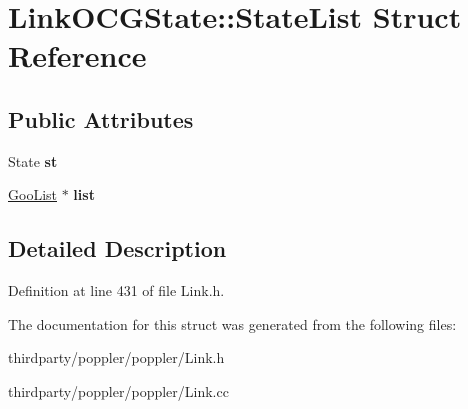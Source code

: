 \hypertarget{struct_link_o_c_g_state_1_1_state_list}{}\section{Link\+O\+C\+G\+State\+:\+:State\+List Struct Reference}
\label{struct_link_o_c_g_state_1_1_state_list}
\subsection*{Public Attributes}
\begin{DoxyCompactItemize}
\item 
\mbox{\label{struct_link_o_c_g_state_1_1_state_list_a26b61663ec1555a8b6174a85cda7d481}} 
State {\bfseries st}
\item 
\mbox{\label{struct_link_o_c_g_state_1_1_state_list_a0fd3dd6bffa6f7bd89a7381b2472fbc3}} 
\hyperlink{class_goo_list}{Goo\+List} $\ast$ {\bfseries list}
\end{DoxyCompactItemize}


\subsection{Detailed Description}


Definition at line 431 of file Link.\+h.



The documentation for this struct was generated from the following files\+:\begin{DoxyCompactItemize}
\item 
thirdparty/poppler/poppler/Link.\+h\item 
thirdparty/poppler/poppler/Link.\+cc\end{DoxyCompactItemize}
